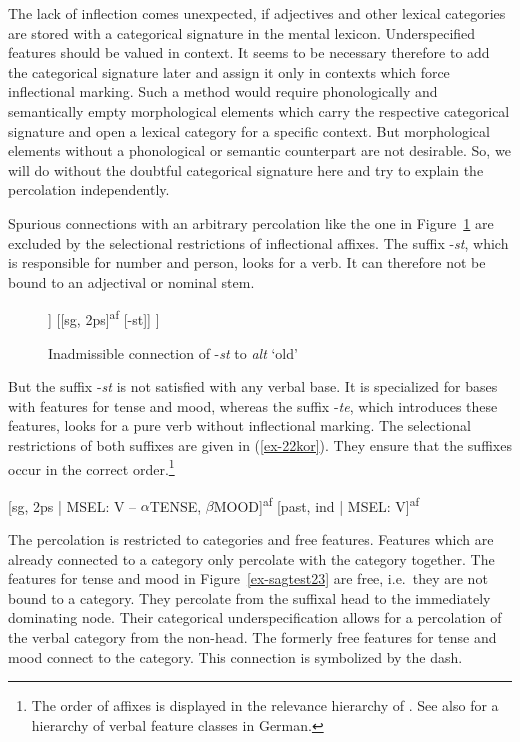 \documentclass[output=paper
  ,nobabel
  ,draftmode
  ,colorlinks, citecolor=brown
]{langscibook}
\begin{document}
\noindent The lack of inflection comes unexpected, if adjectives and other lexical categories are stored with a categorical signature in the mental lexicon. Underspecified features should be valued in context. It seems to be necessary therefore to add the categorical signature later and assign it only in contexts which force inflectional marking. Such a method would require phonologically and semantically empty morphological elements which carry the respective categorical signature and open a lexical category for a specific context. But morphological elements without a phonological or semantic counterpart are not desirable. So, we will do without the doubtful categorical signature here and try to explain the percolation independently. 

Spurious connections with an arbitrary percolation like the one in Figure~\ref{ex-altst} are excluded by the selectional restrictions of inflectional affixes. The suffix -\emph{st}, which is responsible for number and person, looks for a verb. It can therefore not be bound to an adjectival or nominal stem.

\begin{figure}
\centering
\begin{forest}
	[\textsuperscript{$\ast$}{[A, sg, 2ps]}
		[A [alt]]
		[{[sg, 2ps]}\textsuperscript{af} [-st]]
	]
\end{forest}
\caption{Inadmissible connection of -\emph{st} to \emph{alt} `old'}\label{ex-altst}
\end{figure}


But the suffix -\emph{st} is not satisfied with any verbal base. It is specialized for bases with features for tense and mood, whereas the suffix -\emph{te}, which introduces these features, looks for a pure verb without inflectional marking. The selectional restrictions of both suffixes are given in (\ref{ex-22kor}). They ensure that the suffixes occur in the correct order.\footnote{The order of affixes is displayed in the relevance hierarchy of \citet{Bybee1985}. See also \citet[205]{Eisenberg2006} for a hierarchy of verbal feature classes in German.}

\eal\label{ex-22kor}
\ex {} [sg, 2ps | MSEL: V – $\alpha$TENSE, $\beta$MOOD]\textsuperscript{af}
\ex {} [past, ind | MSEL: V]\textsuperscript{af}
\zl

\noindent The percolation is restricted to categories and free features. Features which are already connected to a category only percolate with the category together. The features for tense and mood in Figure~\ref{ex-sagtest23} are free, i.e.\ they are not bound to a category. They percolate from the suffixal head to the immediately dominating node. Their categorical underspecification allows for a percolation of the verbal category from the non-head. The formerly free features for tense and mood connect to the category. This connection is symbolized by the dash.
\end{document}
